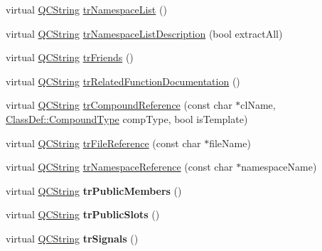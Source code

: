 \begin{DoxyCompactItemize}
\item 
virtual \mbox{\hyperlink{class_q_c_string}{Q\+C\+String}} \mbox{\hyperlink{class_translator_arabic_a33167321877207351c8585d4473c8a5c}{tr\+Namespace\+List}} ()
\item 
virtual \mbox{\hyperlink{class_q_c_string}{Q\+C\+String}} \mbox{\hyperlink{class_translator_arabic_aea04132430764777158628a5df751e47}{tr\+Namespace\+List\+Description}} (bool extract\+All)
\item 
virtual \mbox{\hyperlink{class_q_c_string}{Q\+C\+String}} \mbox{\hyperlink{class_translator_arabic_a7e545f1ee3203efb6d593ef4134614e5}{tr\+Friends}} ()
\item 
virtual \mbox{\hyperlink{class_q_c_string}{Q\+C\+String}} \mbox{\hyperlink{class_translator_arabic_a0f490a6c4b322b59e8d6c22b1a434b36}{tr\+Related\+Function\+Documentation}} ()
\item 
virtual \mbox{\hyperlink{class_q_c_string}{Q\+C\+String}} \mbox{\hyperlink{class_translator_arabic_a85e631bcd4aa1799bbf8d45c7ccdda00}{tr\+Compound\+Reference}} (const char $\ast$cl\+Name, \mbox{\hyperlink{class_class_def_ae70cf86d35fe954a94c566fbcfc87939}{Class\+Def\+::\+Compound\+Type}} comp\+Type, bool is\+Template)
\item 
virtual \mbox{\hyperlink{class_q_c_string}{Q\+C\+String}} \mbox{\hyperlink{class_translator_arabic_aa2eb3e4f87da52248ea4f8f02999c902}{tr\+File\+Reference}} (const char $\ast$file\+Name)
\item 
virtual \mbox{\hyperlink{class_q_c_string}{Q\+C\+String}} \mbox{\hyperlink{class_translator_arabic_ab1685de25aa975dd9481494a1fd5dc86}{tr\+Namespace\+Reference}} (const char $\ast$namespace\+Name)
\item 
\mbox{\label{class_translator_arabic_a11f34bd8deb46e3f063f85b7da809a12}} 
virtual \mbox{\hyperlink{class_q_c_string}{Q\+C\+String}} {\bfseries tr\+Public\+Members} ()
\item 
\mbox{\label{class_translator_arabic_a60ffdc6e5136a04b0419f345ae07a24c}} 
virtual \mbox{\hyperlink{class_q_c_string}{Q\+C\+String}} {\bfseries tr\+Public\+Slots} ()
\item 
\mbox{\label{class_translator_arabic_a1462112ac2dd2187f89747102c64d7e4}} 
virtual \mbox{\hyperlink{class_q_c_string}{Q\+C\+String}} {\bfseries tr\+Signals} ()
\item 
\mbox{\label{class_translator_arabic_a2b780efc27a29346708a7e09db5f91de}} 

\end{DoxyCompactItemize}
